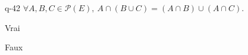 \begin{truefalse}{q-42}
$\forall A,B,C\in\mathcal{P}(E),\ A\cap(B\cup C)=(A\cap B)\cup (A\cap C).$ 
\item* Vrai
\item Faux
\end{truefalse}

